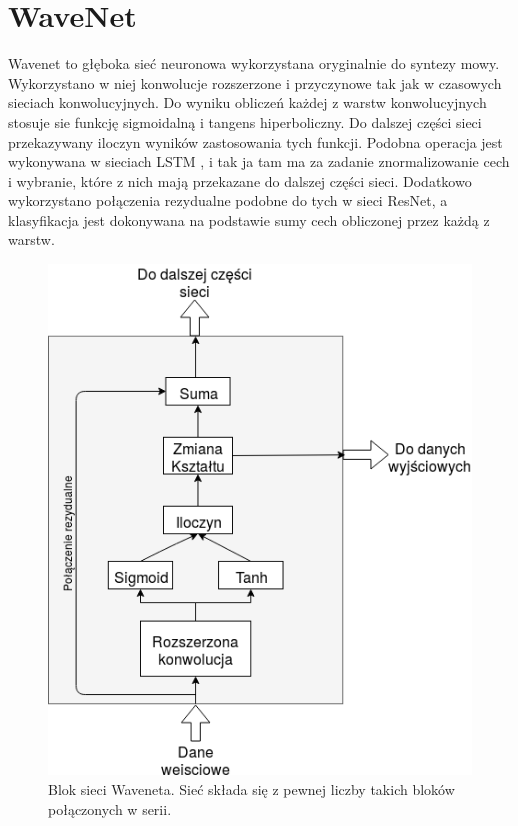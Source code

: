 \documentclass[a4paper,11pt,twoside]{report}
\theoremstyle{definition}
\begin{document}
\section*{WaveNet}

Wavenet to głęboka sieć neuronowa wykorzystana oryginalnie do syntezy mowy\cite{wavenet}. Wykorzystano w niej konwolucje rozszerzone i przyczynowe tak jak w czasowych sieciach konwolucyjnych. Do wyniku obliczeń każdej z warstw konwolucyjnych stosuje sie funkcję sigmoidalną i tangens hiperboliczny. Do dalszej części sieci przekazywany iloczyn wyników zastosowania tych funkcji. Podobna operacja jest wykonywana w sieciach LSTM \cite{lstm}, i tak ja tam ma za zadanie znormalizowanie cech i wybranie, które z nich mają przekazane do dalszej części sieci. Dodatkowo wykorzystano połączenia rezydualne podobne do tych w sieci ResNet\cite{resnet}, a klasyfikacja jest dokonywana na podstawie sumy cech obliczonej przez każdą z warstw.

\begin{figure}[h!]
	\centering
	\includegraphics[scale=0.7]{wavenet_block}
	\caption{Blok sieci Waveneta. Sieć składa się z pewnej liczby takich bloków połączonych w serii.}
\end{figure}
\end{document}

